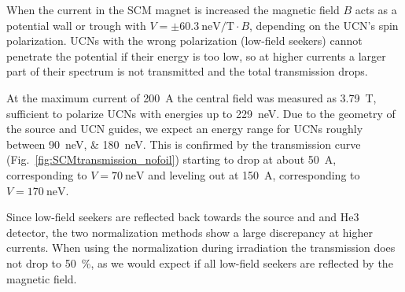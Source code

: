 \documentclass[10pt,letterpaper]{article}
\begin{document}
When the current in the SCM magnet is increased the magnetic field $B$ acts as a potential wall or trough with $V = \pm \SI{60.3}{\nano\electronvolt\per\tesla} \cdot B$, depending on the UCN's spin polarization. UCNs with the wrong polarization (low-field seekers) cannot penetrate the potential if their energy is too low, so at higher currents a larger part of their spectrum is not transmitted and the total transmission drops.

At the maximum current of \SI{200}{\ampere} the central field was measured as \SI{3.79}{\tesla}, sufficient to polarize UCNs with energies up to \SI{229}{\nano\electronvolt}. Due to the geometry of the source and UCN guides, we expect an energy range for UCNs roughly between \SIlist{90;180}{\nano\electronvolt}. This is confirmed by the transmission curve (Fig.~\ref{fig:SCMtransmission_nofoil}) starting to drop at about \SI{50}{\ampere}, corresponding to $V = \SI{70}{\nano\electronvolt}$ and leveling out at \SI{150}{\ampere}, corresponding to $V = \SI{170}{\nano\electronvolt}$.

Since low-field seekers are reflected back towards the source and and He3 detector, the two normalization methods show a large discrepancy at higher currents. When using the normalization during irradiation the transmission does not drop to \SI{50}{\percent}, as we would expect if all low-field seekers are reflected by the magnetic field.
\end{document}
